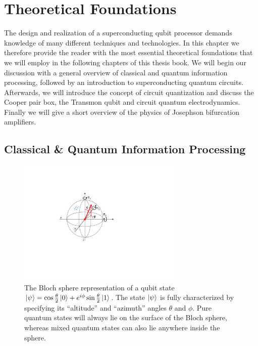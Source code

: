 \chapter{Theoretical Foundations} \label{chapter:theory}

The design and realization of a superconducting qubit processor demands knowledge of many different techniques and technologies. In this chapter we therefore provide the reader with the most essential theoretical foundations that we will employ in the following chapters of this thesis book. We will begin our discussion with a general overview of classical and quantum information processing, followed by an introduction to superconducting quantum circuits. Afterwards, we will introduce the concept of circuit quantization and discuss the Cooper pair box, the Transmon qubit and circuit quantum electrodynamics. Finally we will give a short overview of the physics of Josephson bifurcation amplifiers.

\section{Classical \& Quantum Information Processing}

\begin{figure}
	\includegraphics[width=8cm]{"./material/figures/introduction/bloch_sphere"}
	\caption{The Bloch sphere representation of a qubit state $\left| \psi \right> = \cos{\frac{\theta}{2}}\left| 0 \right>+e^{i\phi}\sin{\frac{\theta}{2}}\left| 1 \right>$. The state $\left| \psi \right>$ is fully characterized by specifying its ``altitude'' and ``azimuth'' angles $\theta$ and $\phi$. Pure quantum states will always lie on the surface of the Bloch sphere, whereas mixed quantum states can also lie anywhere inside the sphere.}
	\label{fig:BlochSphere}
\end{figure}

